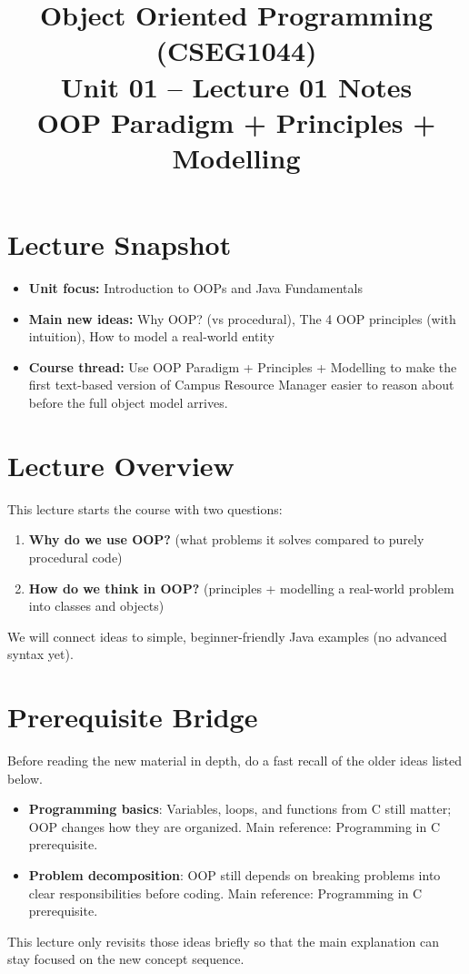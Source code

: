 \documentclass[11pt]{article}
\title{Object Oriented Programming (CSEG1044)\\Unit 01 -- Lecture 01 Notes\\OOP Paradigm + Principles + Modelling}
\begin{document}
\maketitle
\tableofcontents

\section{Lecture Snapshot}
\begin{itemize}
  \item \textbf{Unit focus:} Introduction to OOPs and Java Fundamentals
  \item \textbf{Main new ideas:} Why OOP? (vs procedural), The 4 OOP principles (with intuition), How to model a real-world entity
  \item \textbf{Course thread:} Use OOP Paradigm + Principles + Modelling to make the first text-based version of Campus Resource Manager easier to reason about before the full object model arrives.
\end{itemize}
\notesources{\OOPSUnitISources}

\section{Lecture Overview}
This lecture starts the course with two questions:
\begin{enumerate}
  \item \textbf{Why do we use OOP?} (what problems it solves compared to purely procedural code)
  \item \textbf{How do we think in OOP?} (principles + modelling a real-world problem into classes and objects)
\end{enumerate}
We will connect ideas to simple, beginner-friendly Java examples (no advanced syntax yet).
\notesources{\OOPSUnitISources}

\section{Prerequisite Bridge}
Before reading the new material in depth, do a fast recall of the older ideas listed below.
\begin{itemize}
  \item \textbf{Programming basics}: Variables, loops, and functions from C still matter; OOP changes how they are organized. Main reference: Programming in C prerequisite.
  \item \textbf{Problem decomposition}: OOP still depends on breaking problems into clear responsibilities before coding. Main reference: Programming in C prerequisite.
\end{itemize}
This lecture only revisits those ideas briefly so that the main explanation can stay focused on the new concept sequence.
\notesources{\OOPSUnitISources}
\end{document}
